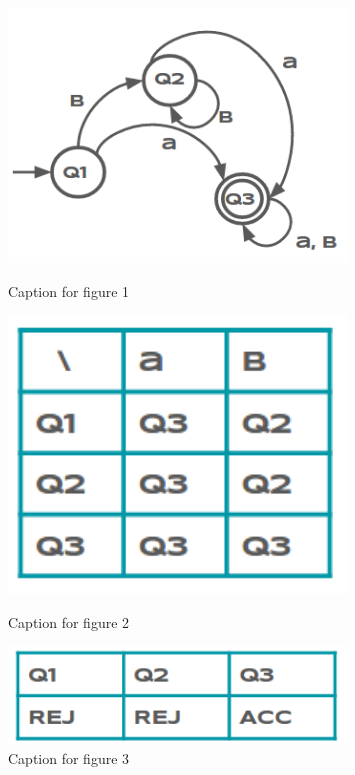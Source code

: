 \documentclass{mini}
\begin{document}
\begin{figure}[H]
\RawFloats
\centering
\begin{minipage}{.4\textwidth}
\centering
  \includegraphics[width=0.8\textwidth]{./images/hc_automata.png}
\caption{Caption for figure 1}
\label{fig:test1}
\end{minipage}\hfill
\begin{minipage}{.25\textwidth}
\centering
  \includegraphics[width=0.8\textwidth]{./images/hc_tt_normal.png}
\caption{Caption for figure 2}
\label{fig:test2}
\end{minipage}\hfill
\begin{minipage}{.25\textwidth}
\centering
  \includegraphics[width=0.8\textwidth]{./images/hc_state_corr.png}
\caption{Caption for figure 3}
\label{fig:test3}
\end{minipage}
\end{figure}
\end{document}
